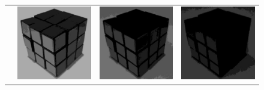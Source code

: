 \begin{figure}
\begin{tabular}{rccc}
         \raisebox{\raiselength}{Luma} &
         \includegraphics[width=\rubiklength]{img/rubik/1_yuv_y.jpg} & 
         \includegraphics[width=\rubiklength]{img/rubik/2_yuv_y.jpg} &
         \includegraphics[width=\rubiklength]{img/rubik/3_yuv_y.jpg}\\
         

\end{tabular}
\end{figure}
